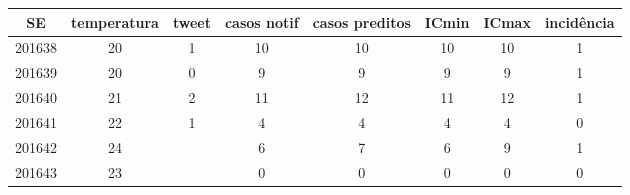 \begin{tabular}{c|ccccccc}
  \hline
SE & temperatura & tweet & casos notif & casos preditos & ICmin & ICmax & incidência \\ 
  \hline
201638 & 20 & 1 & 10 & 10 & 10 & 10 & 1 \\ 
  201639 & 20 & 0 & 9 & 9 & 9 & 9 & 1 \\ 
  201640 & 21 & 2 & 11 & 12 & 11 & 12 & 1 \\ 
  201641 & 22 & 1 & 4 & 4 & 4 & 4 & 0 \\ 
  201642 & 24 &  & 6 & 7 & 6 & 9 & 1 \\ 
  201643 & 23 &  & 0 & 0 & 0 & 0 & 0 \\ 
   \hline
\end{tabular}
